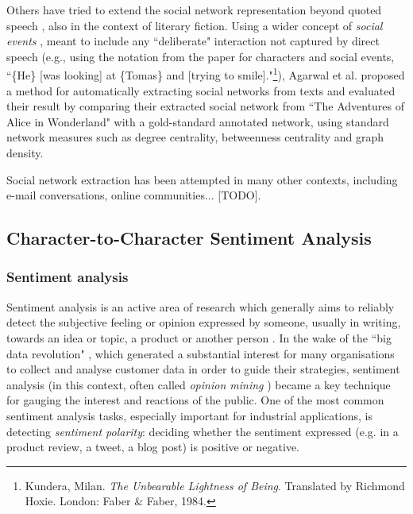 \documentclass[bsc,frontabs,singlespacing,parskip, twoside]{infthesis}
\begin{document}
Others have tried to extend the social network representation beyond quoted speech \cite{Agarwal2013}, also in the context of literary fiction. Using a wider concept of \textit{social events} \cite{agarwal2010annotation}, meant to include any ``deliberate" interaction not captured by direct speech (e.g., using the notation from the paper for characters and social events, ``\{He\} [was looking] at \{Tomas\} and [trying to smile]."\footnote{Kundera, Milan. \textit{The Unbearable Lightness of Being}. Translated by Richmond Hoxie. London: Faber \& Faber, 1984.}), Agarwal et al. proposed a method for automatically extracting social networks from texts and evaluated their result  by comparing their extracted social network from ``The Adventures of Alice in Wonderland" with a gold-standard annotated network, using standard network measures such as degree centrality, betweenness centrality and graph density.

Social network extraction has been attempted in many other contexts, including e-mail conversations, online communities... [TODO]. 

\subsection{Character-to-Character Sentiment Analysis}
\subsubsection{Sentiment analysis}
Sentiment analysis is an active area of research which generally aims to reliably detect the subjective feeling or opinion expressed by someone, usually in writing, towards an idea or topic, a product or another person \cite{varghesesurvey}. In the wake of the ``big data revolution" \cite{mayer2013big}, which generated a substantial interest for many organisations to collect and analyse customer data in order to guide their strategies, sentiment analysis (in this context, often called \textit{opinion mining} \cite{pang2008opinion}) became a key technique for gauging the interest and reactions of the public. One of the most common sentiment analysis tasks, especially important for industrial applications, is detecting \textit{sentiment polarity}: deciding whether the sentiment expressed (e.g. in a product review, a tweet, a blog post) is positive or negative.
\end{document}
